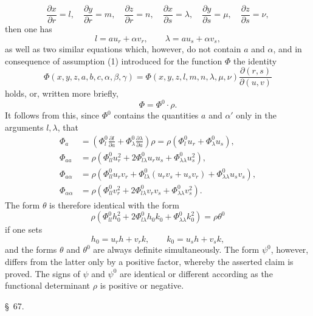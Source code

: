 \documentclass[11pt,a4paper,leqno]{article}
\begin{document}
\[
\frac{\partial x}{\partial r}=l,\quad
\frac{\partial y}{\partial r}=m,\quad
\frac{\partial z}{\partial r}=n,\quad
\frac{\partial x}{\partial s}=\lambda,\quad
\frac{\partial y}{\partial s}=\mu,\quad
\frac{\partial z}{\partial s}=\nu,
\]
then one has
\[
l=au_r+\alpha v_r,\qquad \lambda=au_s+\alpha v_s,
\]
as well as two similar equations which, however, do not contain $a$ and
$\alpha$, and in consequence of assumption (1) introduced for the function
$\Phi$ the identity
\[
\Phi(x,y,z,a,b,c,\alpha,\beta,\gamma)
=\Phi(x,y,z,l,m,n,\lambda,\mu,\nu)
\frac{\partial(r,s)}{\partial(u,v)}
\]
holds, or, written more briefly,
\[
\Phi=\Phi^0\cdot\rho.
\]
It follows from this, since $\Phi^0$ contains the quantities $a$ and $\alpha'$
only in the arguments $l,\lambda$, that
\[
\begin{aligned}
\Phi_a
&=\left(\Phi_l^0\frac{\partial l}{\partial a}
+\Phi_\lambda^0\frac{\partial\lambda}{\partial a}\right)\rho
=\rho(\Phi_l^0u_r+\Phi_\lambda^0u_s),\\
\Phi_{aa}
&=\rho\left(\Phi_{ll}^0u_r^2+2\Phi_{l\lambda}^0u_ru_s
+\Phi_{\lambda\lambda}^0u_s^2\right),\\
\Phi_{a\alpha}
&=\rho\left(\Phi_{ll}^0u_rv_r
+\Phi_{l\lambda}^0(u_rv_s+u_sv_r)
+\Phi_{\lambda\lambda}^0u_sv_s\right),\\
\Phi_{\alpha\alpha}
&=\rho\left(\Phi_{ll}^0v_r^2+2\Phi_{l\lambda}^0v_rv_s
+\Phi_{\lambda\lambda}^0v_s^2\right).
\end{aligned}
\]
The form $\theta$ is therefore identical with the form
\[
\rho\left(\Phi_{ll}^0h_0^2+2\Phi_{l\lambda}^0h_0k_0
+\Phi_{\lambda\lambda}^0k_0^2\right)=\rho\theta^0
\]
if one sets
\[
h_0=u_rh+v_rk,\qquad k_0=u_sh+v_sk,
\]
and the forms $\theta$ and $\theta^0$ are always definite simultaneously.
The form $\psi^0$, however, differs from the latter only by a positive
factor, whereby the asserted claim is proved. The signs of $\psi$ and $\psi^0$
are identical or different according as the functional determinant $\rho$
is positive or negative.


\begin{center}
{\large \S~67.}
\end{center}
\end{document}
